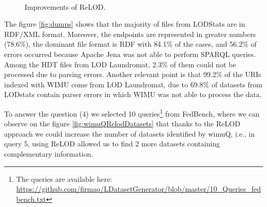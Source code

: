 \begin{figure}[H]
\begin{center}
{        }\\ %
%
    \end{center}
    \caption{%
       Improvements of ReLOD.
     }%
   \label{fig:subfigures}
\end{figure}

The figure \ref{fig:dumps} shows that the majority of files from LODStats are in RDF/XML format.
Moreover, the endpoints are represented in greater numbers (78.6\%), the dominant file format is RDF with 84.1\% of the cases, and 56.2\% of errors occurred because Apache Jena was not able to perform SPARQL queries.
Among the HDT files from LOD Laundromat, 2.3\% of them could not be processed due to parsing errors.
Another relevant point is that 99.2\% of the URIs indexed with WIMU come from LOD Laundromat, due to 69.8\% of datasets from LODstats contain parser errors in which WIMU was not able to process the data.

To answer the question (4) we selected 10 queries\footnote{The queries are available here: \url{https://github.com/firmao/LDatasetGenerator/blob/master/10_Queries_fedbench.txt}} from FedBench\cite{fedbench2011}, where we can observe on the figure \ref{fig:wimuQRelodDatasets} that thanks to the ReLOD approach we could increase the number of datasets identified by wimuQ, i.e., in query 5, using ReLOD allowed us to find 2 more datasets containing complementary information. 

